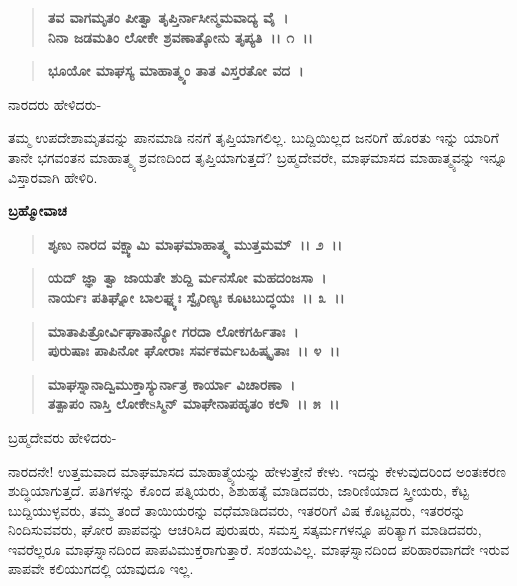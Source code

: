 \begin{verse}
\textbf{ತವ ವಾಗಮೃತಂ ಪೀತ್ವಾ ತೃಪ್ತಿರ್ನಾಸೀನ್ಮಮವಾದ್ಯ ವೈ~।}\\\textbf{ನಿನಾ ಜಡಮತಿಂ ಲೋಕೇ ಶ್ರವಣಾತ್ಕೋನು ತೃಪ್ಯತಿ~।। ೧~।।}
\end{verse}

\begin{verse}
\textbf{ಭೂಯೋ ಮಾಘಸ್ಯ ಮಾಹಾತ್ಮ್ಯಂ ತಾತ ವಿಸ್ತರತೋ ವದ~।}
\end{verse}

\begin{flushleft}
ನಾರದರು ಹೇಳಿದರು-
\end{flushleft}

ತಮ್ಮ ಉಪದೇಶಾಮೃತವನ್ನು ಪಾನಮಾಡಿ ನನಗೆ ತೃಪ್ತಿಯಾಗಲಿಲ್ಲ. ಬುದ್ದಿಯಿಲ್ಲದ ಜನರಿಗೆ ಹೊರತು ಇನ್ನು ಯಾರಿಗೆ ತಾನೇ ಭಗವಂತನ ಮಾಹಾತ್ಮ್ಯ ಶ್ರವಣದಿಂದ ತೃಪ್ತಿಯಾಗುತ್ತದೆ? ಬ್ರಹ್ಮದೇವರೇ, ಮಾಘಮಾಸದ ಮಾಹಾತ್ಮ್ಯವನ್ನು ಇನ್ನೂ ವಿಸ್ತಾರವಾಗಿ ಹೇಳಿರಿ.

\begin{flushleft}
\textbf{ಬ್ರಹ್ಮೋವಾಚ\enginline{-}}
\end{flushleft}

\begin{verse}
\textbf{ಶೃಣು ನಾರದ ವಕ್ಷ್ಯಾಮಿ ಮಾಘಮಾಹಾತ್ಮ್ಯ ಮುತ್ತಮಮ್~।। ೨~।। }
\end{verse}

\begin{verse}
\textbf{ಯದ್ ಜ್ಞಾ ತ್ವಾ ಜಾಯತೇ ಶುದ್ದಿ ರ್ಮನಸೋ ಮಹದಂಜಸಾ~।}\\\textbf{ನಾರ್ಯಃ ಪತಿಘ್ನೋ ಬಾಲಘ್ನ್ಯಃ ಸ್ವೈರಿಣ್ಯಃ ಕೂಟಬುದ್ಧಯಃ~।। ೩~।। }
\end{verse}

\begin{verse}
\textbf{ಮಾತಾಪಿತ್ರೋರ್ವಿಘಾತಾನ್ಯೋ ಗರದಾ ಲೋಕಗರ್ಹಿತಾಃ~।}\\\textbf{ಪುರುಷಾಃ ಪಾಪಿನೋ ಘೋರಾಃ ಸರ್ವಕರ್ಮಬಹಿಷ್ಕೃತಾಃ~।। ೪~।। }
\end{verse}

\begin{verse}
\textbf{ಮಾಘಸ್ನಾನಾದ್ವಿಮುಕ್ತಾಸ್ಯುರ್ನಾತ್ರ ಕಾರ್ಯಾ ವಿಚಾರಣಾ~।}\\\textbf{ತತ್ಪಾಪಂ ನಾಸ್ತಿ ಲೋಕೇsಸ್ಮಿನ್ ಮಾಘೇನಾಪಹೃತಂ ಕಲೌ~।। ೫~।।}
\end{verse}

\begin{flushleft}
ಬ್ರಹ್ಮದೇವರು ಹೇಳಿದರು-
\end{flushleft}

ನಾರದನೇ! ಉತ್ತಮವಾದ ಮಾಘಮಾಸದ ಮಾಹಾತ್ಮ್ಯೆಯನ್ನು ಹೇಳುತ್ತೇನೆ ಕೇಳು. ಇದನ್ನು ಕೇಳುವುದರಿಂದ ಅಂತಃಕರಣ ಶುದ್ಧಿಯಾಗುತ್ತದೆ. ಪತಿಗಳನ್ನು ಕೊಂದ ಪತ್ನಿಯರು, ಶಿಶುಹತ್ಯೆ ಮಾಡಿದವರು, ಜಾರಿಣಿಯಾದ ಸ್ತ್ರೀಯರು, ಕೆಟ್ಟ ಬುದ್ದಿಯುಳ್ಳವರು, ತಮ್ಮ ತಂದೆ ತಾಯಿಯರನ್ನು ವಧೆಮಾಡಿದವರು, ಇತರರಿಗೆ ವಿಷ ಕೊಟ್ಟವರು, ಇತರರನ್ನು ನಿಂದಿಸುವವರು, ಘೋರ ಪಾಪವನ್ನು ಆಚರಿಸಿದ ಪುರುಷರು, ಸಮಸ್ತ ಸತ್ಕರ್ಮಗಳನ್ನೂ ಪರಿತ್ಯಾಗ ಮಾಡಿದವರು, ಇವರೆಲ್ಲರೂ ಮಾಘಸ್ನಾನದಿಂದ ಪಾಪವಿಮುಕ್ತರಾಗುತ್ತಾರೆ. ಸಂಶಯವಿಲ್ಲ. ಮಾಘಸ್ನಾನದಿಂದ ಪರಿಹಾರವಾಗದೇ ಇರುವ ಪಾಪವೇ ಕಲಿಯುಗದಲ್ಲಿ ಯಾವುದೂ ಇಲ್ಲ.

